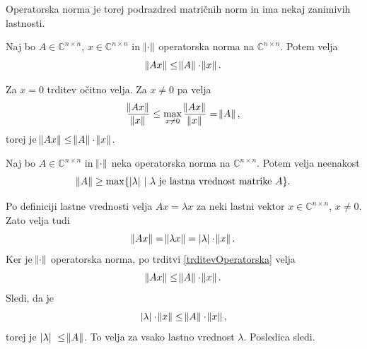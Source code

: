 \documentclass[mat1]{fmfdelo}
\newcommand{\C}{\mathbb C}
\begin{document}
Operatorska norma je torej podrazdred matričnih norm in ima nekaj zanimivih lastnosti.
\begin{trditev}\label{trditevOperatorska}
    Naj bo $A \in \C^{n \times n}$, $x \in \C^{n \times n}$ in $\norm{\cdot}$ operatorska norma na $\C^{n \times n}$. Potem velja
    \begin{equation*}
        \norm{A x} \leq \norm{A} \cdot \norm{x}.
    \end{equation*}
\end{trditev}
\begin{dokaz}
    Za $x = 0$ trditev očitno velja. Za $x \neq 0$ pa velja
    \begin{equation*}
        \frac{\norm{A x}}{\norm{x}} \leq \max_{x \neq 0} \frac{\norm{A x}}{\norm{x}} = \norm{A},
    \end{equation*}
    torej je $\norm{A x} \leq \norm{A} \cdot \norm{x}$.
\end{dokaz}
\begin{posledica}\label{posledicaOperatorskaNorma}
    Naj bo $A \in \C^{n \times n}$ in $\norm{\cdot}$ neka operatorska norma na $\C^{n \times n}$. Potem velja neenakost
    \begin{equation*}
        \norm{A} \geq \max\{|\lambda|\ |\ \lambda\  \text{je lastna vrednost matrike}\  A\}.
    \end{equation*}
\end{posledica}
\begin{dokaz}
    Po definiciji lastne vrednosti velja $A x = \lambda x$ za neki lastni vektor $x \in \C^{n \times n}$, $x \neq 0 $. Zato velja tudi
    \begin{equation*}
        \norm{A x} = \norm{\lambda x} = |\lambda|\cdot \norm{x}.
    \end{equation*}    
    Ker je $\norm{\cdot}$ operatorska norma, po trditvi \ref{trditevOperatorska} velja
    \begin{equation*}
        \norm{A x} \leq \norm{A} \cdot \norm{x}.
    \end{equation*}
    Sledi, da je
    \begin{equation*}
        |\lambda|\cdot \norm{x} \leq \norm{A} \cdot \norm{x},
    \end{equation*}
    torej je $|\lambda| \leq \norm{A}$. To velja za vsako lastno vrednost $\lambda$. Posledica sledi.
\end{dokaz}
\end{document}
